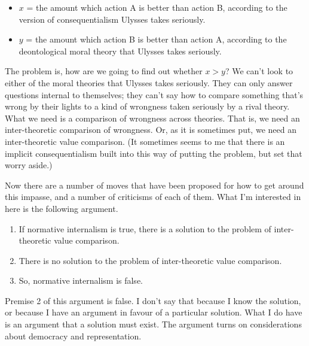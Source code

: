 \begin{itemize}
\item{} $x$ = the amount which action A is better than action B, according to the version of consequentialism \gls{Ulysses} takes seriously.

\item{} $y$ = the amount which action B is better than action A, according to the deontological moral theory that \gls{Ulysses} takes seriously.

\end{itemize}
The problem is, how are we going to find out whether $x > y$? We can't look to either of the moral theories that \gls{Ulysses} takes seriously. They can only answer questions internal to themselves; they can't say how to compare something that's wrong by their lights to a kind of wrongness taken seriously by a rival theory. What we need is a comparison of wrongness across theories. That is, we need an inter-theoretic comparison of wrongness. Or, as it is sometimes put, we need an inter-theoretic value comparison. (It sometimes seems to me that there is an implicit consequentialism built into this way of putting the problem, but set that worry aside.)

Now there are a number of moves that have been proposed for how to get around this impasse, and a number of criticisms of each of them. What I'm interested in here is the following argument.

\begin{enumerate}
\item{} If normative internalism is true, there is a solution to the problem of inter-theoretic value comparison.

\item{} There is no solution to the problem of inter-theoretic value comparison.

\item{} So, normative internalism is false.

\end{enumerate}
Premise 2 of this argument is false. I don't say that because I know the solution, or because I have an argument in favour of a particular solution. What I do have is an argument that a solution must exist. The argument turns on considerations about democracy and representation.

